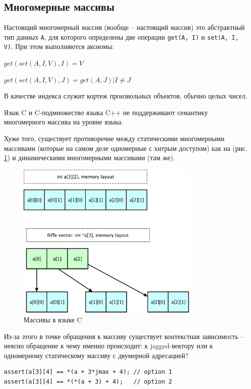 \documentclass[a4paper,12pt,oneside]{book}
\begin{document}
\subsection{Многомерные массивы}\label{MultiDimArr}

Настоящий многомерный массив (вообще -- настоящий массив) это абстрактный тип данных \lstinline!A!, для которого определены две операции \lstinline!get(A, I)! и \lstinline!set(A, I, V)!. При этом выполняются аксиомы:

$get(set(A,I,V),I)=V$

$get(set(A,I,V),J)=get(A,J)|I \neq J$

В качестве индекса служит кортеж произвольных объектов, обычно целых чисел.

Язык C и C-подмножество языка C++ не поддерживают семантику многомерного массива на уровне языка.

Хуже того, существует противоречие между статическими многомерными массивами (которые на самом деле одномерные с хитрым доступом) как на (рис. \ref{fig:c_arrays}) и динамическими многомерными массивами (там же).

\begin{figure}[h!]
\centering
\includegraphics[width=0.8\textwidth]{illustrations/arraylayout-crop.pdf}
\caption{Массивы в языке C}
\label{fig:c_arrays}
\end{figure}

Из-за этого в точке обращения к массиву существует контекстная зависимость -- неясно обращение к чему именно происходит: к jagged-вектору или к одномерному статическому массиву с двумерной адресацией?

\begin{lstlisting}
assert(a[3][4] == *(a + 3*jmax + 4); // option 1
assert(a[3][4] == *(*(a + 3) + 4);   // option 2 
\end{lstlisting}
\end{document}
